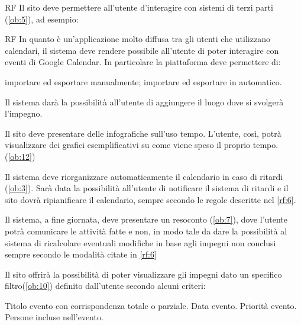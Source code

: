 \begin{listaPersonale}{RF}
	 Il sito deve permettere all'utente d'interagire con sistemi di terzi parti (\ref{ob:5}), ad esempio:

	\begin{listaPersonale2}{RF}
		 In quanto è un'applicazione molto diffusa tra gli utenti che utilizzano calendari, il sistema deve rendere possibile all'utente di poter interagire con eventi di Google Calendar. In particolare la piattaforma deve permettere di:
		\begin{listaPersonale3}{}
			 importare ed esportare manualmente;
			 importare ed esportare in automatico.
		\end{listaPersonale3}

		 Il sistema darà la possibilità all'utente di aggiungere il luogo dove si svolgerà l'impegno.
	\end{listaPersonale2}

	 Il sito deve presentare delle infografiche sull'uso tempo. L'utente, così, potrà visualizzare dei grafici esemplificativi su come viene speso il proprio tempo. (\ref{ob:12})

	 Il sistema deve riorganizzare automaticamente il calendario in caso di ritardi (\ref{ob:3}). Sarà data la possibilità all'utente di notificare il sistema di ritardi e il sito dovrà ripianificare il calendario, sempre secondo le regole descritte nel \ref{rf:6}.

	 Il sistema, a fine giornata, deve presentare un resoconto (\ref{ob:7}), dove l'utente potrà comunicare le attività fatte e non, in modo tale da dare la possibilità al sistema di ricalcolare eventuali modifiche in base agli impegni non conclusi sempre secondo le modalità citate in \ref{rf:6}

	 Il sito offrirà la possibilità di poter visualizzare gli impegni dato un specifico filtro(\ref{ob:10}) definito dall'utente secondo alcuni criteri:
	\begin{listaPersonale2}{}
		 Titolo evento con corrispondenza totale o parziale.
		 Data evento.
		 Priorità evento.
		 Persone incluse nell'evento.
	\end{listaPersonale2}


\end{listaPersonale}

